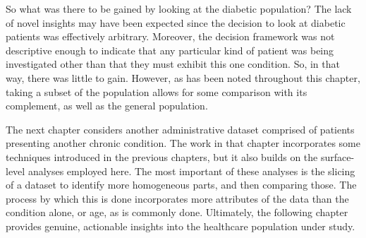 So what was there to be gained by looking at the diabetic population? The lack
of novel insights may have been expected since the decision to look at diabetic
patients was effectively arbitrary. Moreover, the decision framework was not
descriptive enough to indicate that any particular kind of patient was being
investigated other than that they must exhibit this one condition. So, in that
way, there was little to gain. However, as has been noted throughout this
chapter, taking a subset of the population allows for some comparison with its
complement, as well as the general population.

The next chapter considers another administrative dataset comprised of patients
presenting another chronic condition. The work in that chapter incorporates some
techniques introduced in the previous chapters, but it also builds on the
surface-level analyses employed here. The most important of these analyses is
the slicing of a dataset to identify more homogeneous parts, and then comparing
those. The process by which this is done incorporates more attributes of the
data than the condition alone, or age, as is commonly done. Ultimately, the
following chapter provides genuine, actionable insights into the healthcare
population under study.
